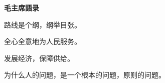 \sffamily

\begin{center}
\huge
{%
	\bfseries
	毛主席語录
}
\end{center}

\Large
\doublespacing
\setlength{\parindent}{2em}

路线是个纲，纲举目张。

全心全意地为人民服务。

发展经济，保障供给。

为什么人的问题，是一个根本的问题，原则的问题。

